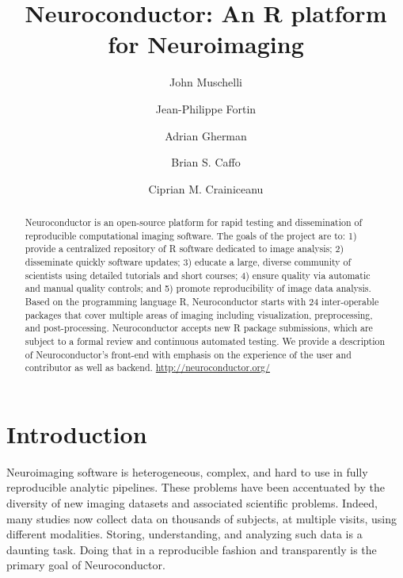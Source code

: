 \documentclass[]{elsarticle} %
\newcommand{\fixme}[1]{{\color{red} #1}}
\begin{document}
\begin{frontmatter}

  \title{Neuroconductor: An R platform for Neuroimaging}
    \author[JHU]{John Muschelli}
    \author[Penn]{Jean-Philippe Fortin}
  
    \author[JHU]{Adrian Gherman}
  
    \author[JHU]{Brian S. Caffo}
  
    \author[JHU]{Ciprian M. Crainiceanu}
  
      \address[JHU]{Johns Hopkins Bloomberg School of Public Health, Department of
Biostatistics, 615 N Wolfe St, Baltimore, MD, 21205}
    \address[Penn]{Perelman School of Medicine, University of Pennsylvania, Department of
Biostatistics and Epidemiology, 423 Guardian Drive, Philadelphia, PA
19104}
  
  \begin{abstract}
Neuroconductor is an open-source platform for rapid testing and dissemination of reproducible computational imaging software. The goals of the project are to: 1) provide a centralized repository of R software dedicated to image analysis; 2) disseminate quickly software updates; 3) educate a large, diverse community of scientists using detailed tutorials and short courses; 4) ensure quality via automatic and manual quality controls; and 5) promote reproducibility of image data analysis. Based on the  programming language R, Neuroconductor starts with \fixme{24} inter-operable packages that cover multiple areas of imaging including visualization, preprocessing, and post-processing. Neuroconductor accepts new R package submissions, which are subject to a formal review and continuous automated testing. We provide a description of Neuroconductor's front-end with emphasis on the experience of the user and contributor as well as backend. \url{http://neuroconductor.org/}  
  \end{abstract}
 
 \end{frontmatter}

\section{Introduction}\label{introduction}

Neuroimaging software is heterogeneous, complex, and hard to use in fully reproducible analytic pipelines. These problems have been accentuated by the diversity of new imaging datasets and associated scientific problems. Indeed, many studies now collect data on thousands of subjects, at multiple visits, using different modalities. Storing, understanding, and analyzing such data is a daunting task. Doing that in a reproducible fashion and transparently is the primary goal of Neuroconductor.
 
\end{document}
